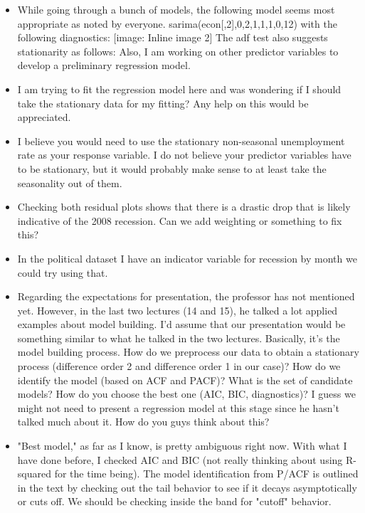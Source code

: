\begin{itemize}
 \item  While going through a bunch of models, the following model seems most appropriate as noted by everyone. sarima(econ[,2],0,2,1,1,1,0,12) with the following diagnostics: [image: Inline image 2] The adf test also suggests stationarity as follows:  Also, I am working on other predictor variables to develop a preliminary regression model.
  
 \item  I am trying to fit the regression model here and was wondering if I should
take the stationary data for my fitting? Any help on this would be
appreciated.

\item I believe you would need to use the stationary non-seasonal unemployment rate as your response variable. I do not believe your predictor variables have to be stationary, but it would probably make sense to at least take the seasonality out of them.

\item Checking both residual plots shows that there is a drastic drop that is likely indicative of the 2008 recession. Can we add weighting or something to fix this?

\item In the political dataset I have an indicator variable for recession by month we could try using that. 

\item Regarding the expectations for presentation, the professor has not mentioned yet. However, in the last two lectures (14 and 15), he talked a lot applied examples about model building. I'd assume that our presentation would be something similar to what he talked in the two lectures. Basically, it's the model building process. How do we preprocess our data to obtain a stationary process (difference order 2 and difference order 1 in our case)? How do we identify the model (based on ACF and PACF)? What is the set of candidate models? How do you choose the best one (AIC, BIC, diagnostics)? I guess we might not need to present a regression model at this stage since he hasn't talked much about it. How do you guys think about this?

\item "Best model," as far as I know, is pretty ambiguous right now. With what I have done before, I checked AIC and BIC (not really thinking about using R-squared for the time being). The model identification from P/ACF is outlined in the text by checking out the tail behavior to see if it decays asymptotically or cuts off. We should be checking inside the band for "cutoff" behavior.


\end{itemize}
